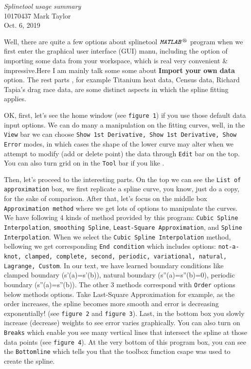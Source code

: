 \documentclass{article}
\newcommand{\myname}{Mark Taylor}
\begin{document}
\pagecolor{pink}
\begin{center}
{\Huge \textcolor[rgb]{0.1,0.3,1}{\textit{Splinetool usage summary } }}\\[5mm]
10170437 \myname\\
Oct. 6, 2019\\[20pt]
\end{center}

Well, there are quite a few options about splinetool $\texttt{\emph{MATLAB}}^\circledR$ program when we first enter
the graphical user interface (GUI)  manu,  including the option of importing some data from your workspace, which is
real very convenient \&  impressive.\quad Here I am mainly talk some some about \textbf{Import your own data} option.
The rest parts , for example Titanium heat data, Census data, Richard Tapia's drag race data, are some distinct aspects in
which the spline fitting applies.\par

OK, first, let's see the home window (see \texttt{figure 1})  if you use those default data input options.
We can do many a  manipulation on the fitting curves, well, in the \texttt{View} bar we can
choose  \texttt{Show 1st Derivative, Show 1st Derivative, Show Error}  modes, in which cases the
shape of the lower curve may alter when we attempt to modify (add or delete point) the data
through \texttt{Edit} bar on the top. You can also turn grid on in the \texttt{Tool} bar if you like .\par

Then, let's proceed to the interesting parts. On the top we can see the \texttt{List of approximation} box,
we first replicate a spline curve, you know, just do a copy, for the sake of comparison.  After that,
let's focus on the middle box \texttt{Approximation method} where we get lots of options to manipulate
the curves. We have following 4 kinds of method provided by this program: \texttt{Cubic Spline
Interpolation}, \texttt{smoothing Spline}, \texttt{Least-Square Approximation}, and \texttt{Spline Interpolation}.
When we select the \texttt{Cubic Spline Interpolation} method, bellowing we get corresponding \texttt{End condition}
which includes options: \texttt{not-a-knot, clamped, complete, second, periodic, variational,
natural, Lagrange, Custom}. In our text, we have learned boundary  conditions
like clamped boundary (s'(a)=s'(b)), natural boundary (s''(a)=s''(b)=0),
periodic boundary (s''(a)=s''(b)).  The other 3 methods correspond with \texttt{Order} options below
methods options. Take Last-Square Approximation for example, as the order increases,
the spline becomes more smooth and error is decreasing exponentially! (see \texttt{figure 2}
and \texttt{figure 3}). Last, in the bottom box you slowly increase (decrease)  weights to
see error varies graphically. You can also turn on \texttt{Breaks} which enable you see many vertical
lines that intersect the spline at those data points (see \texttt{figure 4}). At the very bottom of this program
box, you can see the \texttt{Bottomline}  which tells you that the toolbox function csape was used to create the spline.
\end{document}
